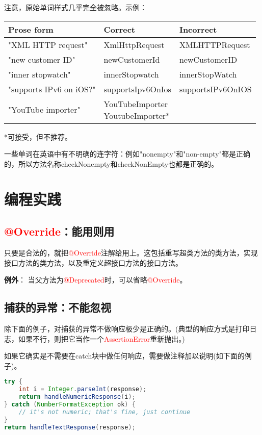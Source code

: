 \documentclass[cn,11pt,chinese]{elegantbook}
\begin{document}
注意，原始单词样式几乎完全被忽略。示例：
\begin{table}[!htb]
	\centering
	\begin{tabular}{|l|l|l|}
		\hline
		\textbf{Prose form} & \textbf{Correct} & \textbf{Incorrect}\\
		\hline
		"XML HTTP request" & XmlHttpRequest & XMLHTTPRequest\\
		\hline
		"new customer ID" & newCustomerId & newCustomerID \\
		\hline
		"inner stopwatch" & innerStopwatch & innerStopWatch\\
		\hline
		"supports IPv6 on iOS?" & supportsIpv6OnIos & supportsIPv6OnIOS\\
		\hline
		"YouTube importer" & \makecell{YouTubeImporter \\ YoutubeImporter*} & \\
		\hline
	\end{tabular}
\end{table}

*可接受，但不推荐。

\begin{note}
	一些单词在英语中有不明确的连字符：例如"nonempty"和"non-empty"都是正确的，所以方法名称checkNonempty和checkNonEmpty也都是正确的。
\end{note}

\chapter{编程实践}
\section{\textcolor{red}{@Override}：能用则用}
只要是合法的，就把\textcolor{red}{@Override}注解给用上。这包括重写超类方法的类方法，实现接口方法的类方法，以及重定义超接口方法的接口方法。

\textbf{例外}： 当父方法为\textcolor{red}{@Deprecated}时，可以省略\textcolor{red}{@Override}。

\section{捕获的异常：不能忽视}
除下面的例子，对捕获的异常不做响应极少是正确的。(典型的响应方式是打印日志，如果不行，则把它当作一个\textcolor{red}{AssertionError}重新抛出。)

如果它确实是不需要在catch块中做任何响应，需要做注释加以说明(如下面的例子)。
\begin{lstlisting}[language=java]
try {
	int i = Integer.parseInt(response);
	return handleNumericResponse(i);
} catch (NumberFormatException ok) {
	// it's not numeric; that's fine, just continue
}
return handleTextResponse(response);
\end{lstlisting}
\end{document}
